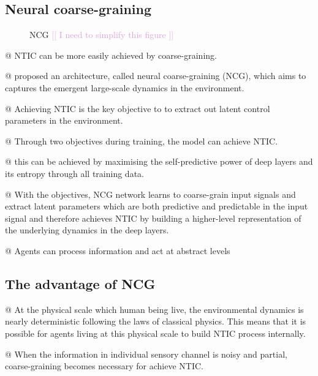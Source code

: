 \documentclass[utf8]{article}
\newenvironment{ants}
			{
			 \begin{easylist}[itemize]		
		 	}
			{
			\end{easylist}
			}
\newcommand{\includegraphicsTodo}[2][]{%
			\tcbox[%
				adjusted title=\LARGE To Be Modified,
				halign title=right,
				colbacktitle=Orange!75!White,
				coltitle=Black,
				colframe=Red!60!White,
				boxrule=1mm,
				colback=white%
				]{\texttt{[image: \#2]}}}
\newcommand{\idea}[2][Plum]{\noindent
				\textcolor{#1}{[[ #2 ]]}}
\begin{document}
		
		
			
		\subsection{Neural coarse-graining}
			\begin{figure}
				\includegraphicsTodo[width=0.8\textwidth]{WritingMaterials/PDFXCview_2018-06-08_14-24-03.png}
				\caption{NCG \idea{I need to simplify this figure}\citep{guttenberg2016neural}}
				\label{fig:NCG}				
			\end{figure}
			
		
		
			\begin{ants}
				@ NTIC can be more easily achieved by coarse-graining. 
				
				@ \citep{guttenberg2016neural} proposed an architecture, called neural coarse-graining (NCG), which aims to captures the emergent large-scale dynamics in the environment. 
				
				@ Achieving NTIC is the key objective to to extract out latent control parameters in the environment.
				
				@ Through two objectives during training, the model can achieve NTIC. 
				
				@ this can be achieved by maximising the self-predictive power of deep layers and its entropy through all training data. 
				
				@ With the objectives, NCG network learns to coarse-grain input signals and  extract latent parameters which are both predictive and predictable in the input signal and therefore achieves NTIC by building a higher-level representation of the underlying dynamics in the deep layers.		
				
				@ Agents can process information and act at abstract levels		
			\end{ants}
		
		
		
			
		\subsection{The advantage of NCG}
			\begin{ants}
				@ At the physical scale which human being live, the environmental dynamics is nearly deterministic following the laws of classical physics. This means that it is possible for agents living at this physical scale to build NTIC process internally. 
				
				@ When the information in individual sensory channel is noisy and partial, coarse-graining becomes necessary for achieve NTIC. 							
			\end{ants}
	
\end{document}
